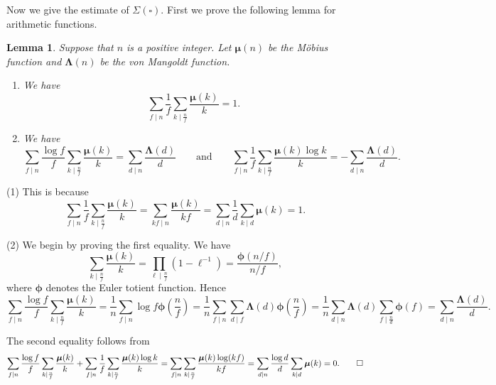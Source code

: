 \documentclass[10pt,oneside,reqno]{amsart}
\makeatletter
\newcommand\legendresymbol[2]{\genfrac{(}{)}{}{}{#1}{#2}}
\theoremstyle{THEOREM}
\newtheorem{lemma}[theorem]{Lemma}
\theoremstyle{DEFINITION}
\theoremstyle{EXERCISE}
\numberwithin{equation}{section}
\renewenvironment{proof}[1][\proofname]{\par
  \vspace{-6pt}
  \pushQED{\qed}
  \normalfont \topsep6\p@\@plus6\p@\relax
  \trivlist
  \item[\hskip\labelsep\rmfamily\bfseries
    #1\@addpunct{:}]\ignorespaces
}{
  \popQED\endtrivlist\@endpefalse
  \vspace{-6pt}
}
\makeatother
\begin{document}
Now we give the estimate of $\Sigma(\square)$. First we prove the following lemma for arithmetic functions.
\begin{lemma}\label{lem:arithmeticfunction}
Suppose that $n$ is a positive integer. Let $\bm{\mu}(n)$ be the M\"obius function and $\bm{\Lambda}(n)$ be the von Mangoldt function.
\begin{enumerate}[itemsep=0pt,parsep=0pt,topsep=0pt, leftmargin=0pt,labelsep=2.5pt,itemindent=15pt,label=\upshape{(\arabic*)}]
\item We have
\[
\sum_{f\mid n}\frac{1}{f}\sum_{k\mid \frac{n}{f}}\frac{\bm{\mu}(k)}{k}=1.
\]
\item We have
\[
\sum_{f\mid n}\frac{\log f}{f}\sum_{k\mid \frac{n}{f}}\frac{\bm{\mu}(k)}{k}=\sum_{d\mid n}\frac{\bm{\Lambda}(d)}{d}
\qquad\text{and}\qquad
\sum_{f\mid n}\frac{1}{f}\sum_{k\mid \frac{n}{f}}\frac{\bm{\mu}(k)\log k}{k}=-\sum_{d\mid n}\frac{\bm{\Lambda}(d)}{d}.
\]
\end{enumerate}
\end{lemma}
\begin{proof}
(1) This is because
\[
\sum_{f\mid n}\frac{1}{f}\sum_{k\mid \frac{n}{f}}\frac{\bm{\mu}(k)}{k}=\sum_{kf\mid n}\frac{\bm{\mu}(k)}{kf}=\sum_{d\mid n}\frac{1}{d}\sum_{k\mid d}\bm{\mu}(k)=1.
\]

(2) We begin by proving the first equality. We have
\[
\sum_{k\mid \frac{n}{f}}\frac{\bm{\mu}(k)}{k}=\prod_{\ell\mid \frac{n}{f}}(1-\ell^{-1})=\frac{\bm{\phi}(n/f)}{n/f},
\] 
where $\bm{\phi}$ denotes the Euler totient function. Hence
\[
\sum_{f\mid n}\frac{\log f}{f}\sum_{k\mid \frac{n}{f}}\frac{\bm{\mu}(k)}{k}=\frac{1}{n}\sum_{f\mid n}\log f\bm{\phi}\legendresymbol{n}{f}=\frac{1}{n}\sum_{f\mid n}\sum_{d\mid f}\bm{\Lambda}(d)\bm{\phi}\legendresymbol{n}{f}=\frac{1}{n}\sum_{d\mid n}\bm{\Lambda}(d)\sum_{f\mid \frac{n}{d}}\bm{\phi}(f)=\sum_{d\mid n}\frac{\bm{\Lambda}(d)}{d}.
\]

The second equality follows from 
\[
\sum_{f\mid n}\frac{\log f}{f}\sum_{k\mid \frac{n}{f}}\frac{\bm{\mu}(k)}{k}+
\sum_{f\mid n}\frac{1}{f}\sum_{k\mid \frac{n}{f}}\frac{\bm{\mu}(k)\log k}{k}= \sum_{f\mid n}\sum_{k\mid \frac{n}{f}}\frac{\bm{\mu}(k)\log (kf)}{kf}=\sum_{d\mid n}\frac{\log d}{d}\sum_{k\mid d}\bm{\mu}(k)=0.\qedhere
\]
\end{proof}
\end{document}
